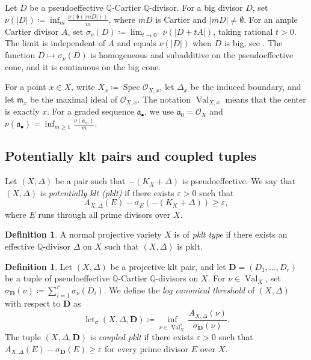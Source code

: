 \documentclass[a4paper,12pt]{amsart}
\theoremstyle{plain}
\theoremstyle{definition}
\newtheorem{definition}[theorem]{Definition}
\numberwithin{equation}{section}
\newcommand{\Q}{\mathbb{Q}}
\newcommand{\OO}{\mathcal{O}}
\DeclareMathOperator{\Val}{Val}
\def\Spec{\operatorname{Spec}}
\def\lct{\operatorname{lct}}
\begin{document}
Let \(D\) be a pseudoeffective \(\Q\)-Cartier \(\Q\)-divisor. For a big divisor $D$, set $\nu(|D|)\coloneqq \inf_m \frac{\nu(\mathfrak{b}(|mD|))}{m}$, where $mD$ is Cartier and $|mD|\neq \emptyset$. For an ample Cartier divisor $A$, set $\sigma_{\nu}(D)\coloneqq \lim_{t\to 0^{+}}\nu(|D+tA|)$, taking rational $t>0$. The limit is independent of $A$ and equals $\nu(|D|)$ when $D$ is big, see \cite[III.1.5]{Nak}. The function \(D\mapsto \sigma_{\nu}(D)\) is homogeneous and subadditive on the pseudoeffective cone, and it is continuous on the big cone. 

For a point $x\in X$, write $X_x\coloneqq \Spec \OO_{X,x}$, let $\Delta_x$ be the induced boundary, and let $\mathfrak{m}_x$ be the maximal ideal of $\OO_{X,x}$. The notation $\Val_{X,x}$ means that the center is exactly $x$. For a graded sequence $\mathfrak{a}_{\bullet}$, we use $\mathfrak{a}_0=\OO_X$ and $\nu(\mathfrak{a}_{\bullet})=\inf_{m\geq 1} \frac{\nu(\mathfrak{a}_m)}{m}$.

\subsection{Potentially klt pairs and coupled tuples}
Let \((X,\Delta)\) be a pair such that \(-(K_X+\Delta)\) is pseudoeffective. We say that $(X,\Delta)$ is \emph{potentially klt (pklt)} if there exists $\varepsilon > 0$ such that
\[
A_{X,\Delta}(E)-\sigma_E(-(K_X+\Delta))\geq \varepsilon,
\]
where \(E\) runs through all prime divisors over \(X\).

\begin{definition}
    A normal projective variety \(X\) is of \emph{pklt type} if there exists an effective \(\Q\)-divisor \(\Delta\) on \(X\) such that \((X,\Delta)\) is pklt.
\end{definition}

\begin{definition}
    Let \((X,\Delta)\) be a projective klt pair, and let \(\mathbf{D}=(D_1,\dots,D_r)\) be a tuple of pseudoeffective \(\Q\)-Cartier \(\Q\)-divisors on \(X\). For \(\nu\in \Val_X\), set $\sigma_{\mathbf{D}}(\nu)\coloneqq \sum_{i=1}^r \sigma_{\nu}(D_i)$. We define the \emph{log canonical threshold} of \((X,\Delta)\) with respect to \(\mathbf{D}\) as 
    \[
    \lct_{\sigma}(X,\Delta,\mathbf{D})\coloneqq \inf_{\nu\in \Val_X^{\ast}}\frac{A_{X,\Delta}(\nu)}{\sigma_{\mathbf{D}}(\nu)}.
    \]
    The tuple \((X,\Delta,\mathbf{D})\) is \emph{coupled pklt} if there exists \(\varepsilon>0\) such that $A_{X,\Delta}(E)-\sigma_{\mathbf{D}}(E)\geq \varepsilon$
    for every prime divisor \(E\) over \(X\).
\end{definition}
\end{document}
